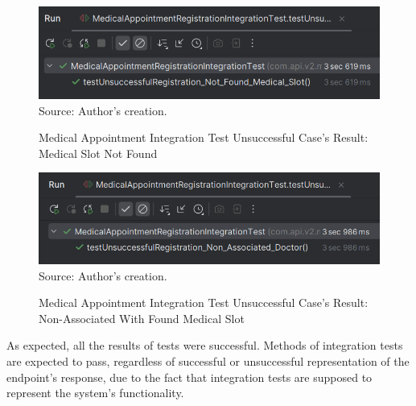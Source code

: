 \begin{figure}[H]
	\centering
	\caption{Medical Appointment Integration Test Unsuccessful Case's Result: Medical Slot Not Found}
	\includegraphics[width=1\linewidth]{figures/medical_appointment_registration_integration_test_unsuccessful_result_medical_slot_not_found.png}
	\label{medical_appointment_registration_integration_test_unsuccessful_result_medical_slot_not_found}
	\footnotesize Source: Author's creation.
\end{figure}

\begin{figure}[H]
	\centering
	\caption{Medical Appointment Integration Test Unsuccessful Case's Result: Non-Associated With Found Medical Slot}
	\includegraphics[width=1\linewidth]{figures/medical_appointment_registration_integration_test_unsuccessful_result_nonassociated_doctor.png}
	\label{medical_appointment_registration_integration_test_unsuccessful_result_nonassociated_doctor}
	\footnotesize Source: Author's creation.
\end{figure}

As expected, all the results of tests were successful. Methods of integration tests are expected to pass, regardless of successful or unsuccessful representation of the endpoint's response, due to the fact that integration tests are supposed to represent the system's functionality.

